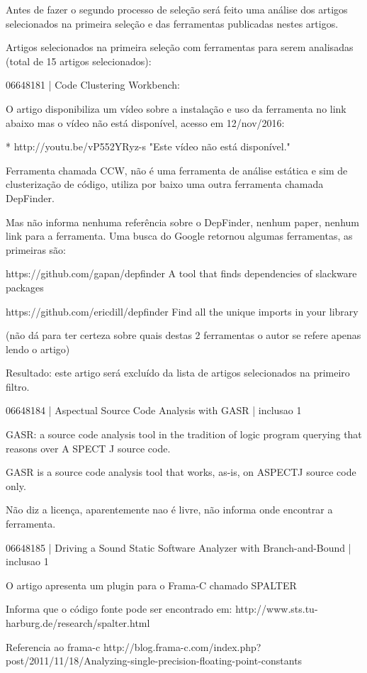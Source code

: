 \documentclass[12pt]{article}
\begin{document}
Antes de fazer o segundo processo de seleção será feito uma análise dos
artigos selecionados na primeira seleção e das ferramentas publicadas nestes
artigos.

Artigos selecionados na primeira seleção com ferramentas para serem
analisadas (total de 15 artigos selecionados):

06648181 | Code Clustering Workbench:

O artigo disponibiliza um vídeo sobre a instalação e uso da ferramenta no link
abaixo mas o vídeo não está disponível, acesso em 12/nov/2016:

* http://youtu.be/vP552YRyz-s "Este vídeo não está disponível."

Ferramenta chamada CCW, não é uma ferramenta de análise estática e sim de
clusterização de código, utiliza por baixo uma outra ferramenta chamada
DepFinder.

Mas não informa nenhuma referência sobre o DepFinder, nenhum paper, nenhum
link para a ferramenta. Uma busca do Google retornou algumas ferramentas, as
primeiras são:

https://github.com/gapan/depfinder
A tool that finds dependencies of slackware packages

https://github.com/ericdill/depfinder
Find all the unique imports in your library

(não dá para ter certeza sobre quais destas 2 ferramentas o autor se refere
apenas lendo o artigo)

Resultado: este artigo será excluído da lista de artigos selecionados na
primeiro filtro.

06648184 | Aspectual Source Code Analysis with GASR | inclusao 1

GASR: a source code analysis tool in the tradition of logic program querying
that reasons over A SPECT J source code.

GASR is a source code analysis tool that works, as-is, on ASPECTJ source code only.

Não diz a licença, aparentemente nao é livre, não informa onde encontrar a
ferramenta.

06648185 | Driving a Sound Static Software Analyzer with Branch-and-Bound | inclusao 1

O artigo apresenta um plugin para o Frama-C chamado SPALTER

Informa que o código fonte pode ser encontrado em:
http://www.sts.tu-harburg.de/research/spalter.html

Referencia ao frama-c
http://blog.frama-c.com/index.php?post/2011/11/18/Analyzing-single-precision-floating-point-constants
\end{document}
